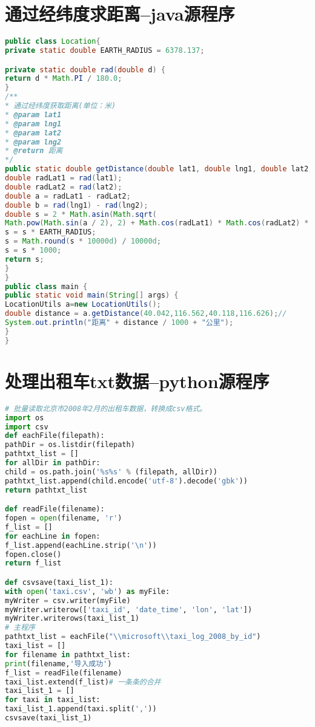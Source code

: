 \documentclass[withoutpreface,bwprint]{cumcmthesis} %
\begin{document}
\newpage
\begin{appendices}

\section{通过经纬度求距离--java源程序}

\begin{lstlisting}[language=java]
public class Location{
private static double EARTH_RADIUS = 6378.137;

private static double rad(double d) {
return d * Math.PI / 180.0;
}
/**
* 通过经纬度获取距离(单位：米)
* @param lat1
* @param lng1
* @param lat2
* @param lng2
* @return 距离
*/
public static double getDistance(double lat1, double lng1, double lat2, double lng2) {
double radLat1 = rad(lat1);
double radLat2 = rad(lat2);
double a = radLat1 - radLat2;
double b = rad(lng1) - rad(lng2);
double s = 2 * Math.asin(Math.sqrt(
Math.pow(Math.sin(a / 2), 2) + Math.cos(radLat1) * Math.cos(radLat2) * Math.pow(Math.sin(b / 2), 2)));
s = s * EARTH_RADIUS;
s = Math.round(s * 10000d) / 10000d;
s = s * 1000;
return s;
}
}
public class main {
public static void main(String[] args) {
LocationUtils a=new LocationUtils();
double distance = a.getDistance(40.042,116.562,40.118,116.626);//
System.out.println("距离" + distance / 1000 + "公里");
}
}
\end{lstlisting}
\newpage

\section{处理出租车txt数据--python源程序}

\begin{lstlisting}[language=python]
# 批量读取北京市2008年2月的出租车数据，转换成csv格式。
import os
import csv
def eachFile(filepath):
pathDir = os.listdir(filepath)
pathtxt_list = []
for allDir in pathDir:
child = os.path.join('%s%s' % (filepath, allDir))
pathtxt_list.append(child.encode('utf-8').decode('gbk'))
return pathtxt_list

def readFile(filename):
fopen = open(filename, 'r')
f_list = []
for eachLine in fopen:
f_list.append(eachLine.strip('\n'))
fopen.close()
return f_list

def csvsave(taxi_list_1):
with open('taxi.csv', 'wb') as myFile:
myWriter = csv.writer(myFile)
myWriter.writerow(['taxi_id', 'date_time', 'lon', 'lat'])
myWriter.writerows(taxi_list_1)
# 主程序
pathtxt_list = eachFile("\\microsoft\\taxi_log_2008_by_id")
taxi_list = []
for filename in pathtxt_list:
print(filename,'导入成功')
f_list = readFile(filename)
taxi_list.extend(f_list)# 一条条的合并
taxi_list_1 = []
for taxi in taxi_list:
taxi_list_1.append(taxi.split(','))
csvsave(taxi_list_1)
\end{lstlisting}

\end{appendices}
\end{document}
